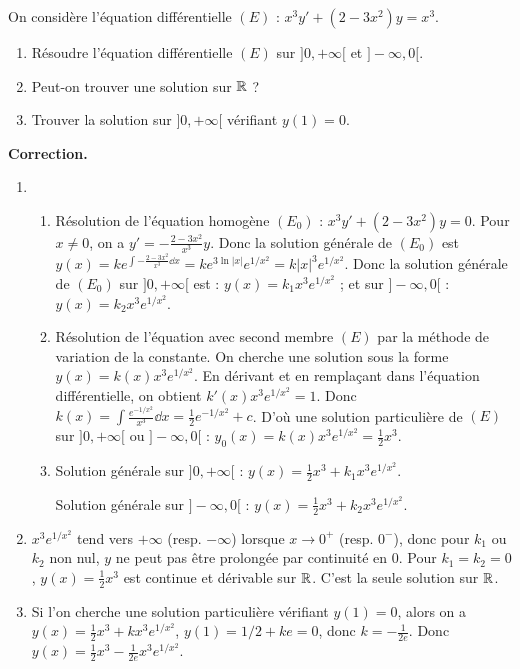 \documentclass[class=report,crop=false]{standalone}
\begin{document}
\begin{exemple}
On considère l'équation différentielle
$(E)$ : $x^3y'+(2-3x^2)y=x^3$.

\begin{enumerate}
\item Résoudre l'équation différentielle $(E)$ sur $]0,+\infty[$ et
  $]-\infty,0[$.

\item Peut-on trouver une solution sur $\mathbb{R}$ ?

\item Trouver la solution sur $]0,+\infty[$ vérifiant $y(1)=0$.
\end{enumerate}


\bigskip
\textbf{Correction.}

\begin{enumerate}
  \item
  \begin{enumerate}
    \item Résolution de l'équation homogène $(E_0)$ :
$x^3y'+(2-3x^2)y=0$.
Pour $x\neq 0$, on a $y'=-\frac{2-3x^2}{x^3}y$. Donc la solution générale
de $(E_0)$ est $y(x)=k e^{\int -\frac{2-3x^2}{x^3}\dd x}
=k e^{3\ln |x|}e^{1/x^2}=k|x|^3e^{1/x^2}$.
Donc la solution générale de $(E_0)$ sur $]0,+\infty[$ est :
$y(x)= k_1 x^3e^{1/x^2}$ ; et sur $]-\infty,0[$ : $y(x)= k_2 x^3e^{1/x^2}$.

    \item Résolution de l'équation avec second membre $(E)$ par la méthode de variation de
la constante.
On cherche une solution sous la forme $y(x)=k(x)x^3e^{1/x^2}$. En dérivant
et en remplaçant dans l'équation différentielle, on obtient
$k'(x) x^3e^{1/x^2} =1. $ Donc $k(x)=\int \frac{e^{-1/x^2}}{x^3}\dd x
=\frac{1}{2}e^{-1/x^2}+c$. D'où une solution particulière de $(E)$ sur
$]0,+\infty[$ ou $]-\infty,0[$ :
$y_0(x)=k(x)x^3e^{1/x^2} =\frac{1}{2}x^3$.

    \item Solution générale sur $]0,+\infty[$ :
$y(x)=\frac{1}{2}x^3+k_1x^3e^{1/x^2}$.

Solution générale sur $]-\infty,0[$ :
$y(x)=\frac{1}{2}x^3+k_2x^3e^{1/x^2}$.
  \end{enumerate}

  \item  $x^3e^{1/x^2}$ tend vers $+\infty$ (resp. $-\infty$) lorsque $x \to 0^+$ (resp. $0^-$),
donc pour $k_1$ ou $k_2$ non nul, $y$ ne
peut pas être prolongée par continuité en $0$.
Pour $k_1=k_2=0$, $y(x)=\frac{1}{2}x^3$ est continue et dérivable sur
$\mathbb{R}$. C'est la seule solution sur $\mathbb{R}$.

  \item Si l'on cherche une solution particulière vérifiant $y(1)=0$,
alors on
a $y(x)=\frac{1}{2}x^3+kx^3e^{1/x^2}$, $y(1)=1/2+ke=0$, donc $k=-\frac{1}{2e}$. Donc
$y(x)=\frac{1}{2}x^3-\frac{1}{2e}x^3e^{1/x^2}$.
\end{enumerate}
\end{exemple}
\end{document}
